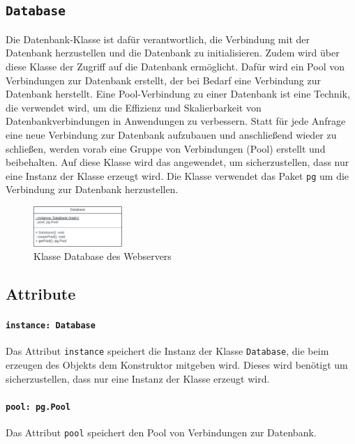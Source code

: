 \documentclass{entwurfsheft}
\begin{document}
\newpage

\subsection{\texttt{Database}}\label{sec:Database}
Die Datenbank-Klasse ist dafür verantwortlich, die Verbindung mit der Datenbank herzustellen und die Datenbank zu initialisieren.
Zudem wird über diese Klasse der Zugriff auf die Datenbank ermöglicht.
Dafür wird ein Pool von Verbindungen zur Datenbank erstellt, der bei Bedarf eine Verbindung zur Datenbank herstellt.
Eine Pool-Verbindung zu einer Datenbank ist eine Technik, die verwendet wird, um die Effizienz und Skalierbarkeit von Datenbankverbindungen in Anwendungen zu verbessern.
Statt für jede Anfrage eine neue Verbindung zur Datenbank aufzubauen und anschließend wieder zu schließen, werden vorab eine Gruppe von Verbindungen (Pool) erstellt und beibehalten.
Auf diese Klasse wird das  angewendet, um sicherzustellen, dass nur eine Instanz der Klasse erzeugt wird.
Die Klasse verwendet das Paket \texttt{pg} um die Verbindung zur Datenbank herzustellen.

\begin{figure}[htp]
    \centering
    \includegraphics[width = 0.3\textwidth]{images/webserver/database.pdf}
    \caption{Klasse Database des Webservers}
    \label{fig:database}
\end{figure}

\subsection*{Attribute}
\paragraph{\texttt{instance: Database}}
Das Attribut \texttt{instance} speichert die Instanz der Klasse \texttt{Database}, die beim erzeugen des Objekts dem Konstruktor mitgeben wird.
Dieses wird benötigt um sicherzustellen, dass nur eine Instanz der Klasse erzeugt wird.
\paragraph{\texttt{pool: pg.Pool}}
Das Attribut \texttt{pool} speichert den Pool von Verbindungen zur Datenbank.
\end{document}

